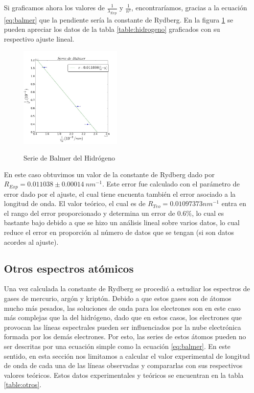 \documentclass[%
 reprint,
 amsmath,amssymb,
 aps,
]{revtex4-1}
\begin{document}
Si graficamos ahora los valores de $\frac{1}{\lambda_{Exp}}$ y $\frac{1}{n^2}$, encontraríamos, gracias a la ecuación \ref{eq:balmer} que la pendiente sería la constante de Rydberg. En la figura \ref{fig:balmer} se pueden apreciar los datos de la tabla \ref{table:hidrogeno} graficados con su respectivo ajuste lineal.\\

\begin{figure}[h]
\caption{Serie de Balmer del Hidrógeno}
\centering
\includegraphics[width=0.45\textwidth]{balmer}
\label{fig:balmer}
\end{figure}

En este caso obtuvimos un valor de la constante de Rydberg dado por $R_{Exp} = 0.011038 \pm 0.00014\ nm^{-1}$. Este error fue calculado con el parámetro de error dado por el ajuste, el cual tiene encuenta también el error asociado a la longitud de onda. El valor teórico, el cual es de $R_{Teo} = 0.01097373 nm^{-1}$ entra en el rango del error proporcionado y determina un error de $0.6\%$, lo cual es bastante bajo debido a que se hizo un análisis lineal sobre varios datos, lo cual reduce el error en proporción al número de datos que se tengan (si son datos acordes al ajuste).\\


\subsection{\label{sec:level2}Otros espectros atómicos}
Una vez calculada la constante de Rydberg se procedió a estudiar los espectros de gases de mercurio, argón y kriptón. Debido a que estos gases son de átomos mucho más pesados, las soluciones de onda para los electrones son en este caso más complejas que la del hidrógeno, dado que en estos casos, los electrones que provocan las líneas espectrales pueden ser influenciados por la nube electrónica formada por los demás electrones. Por esto, las series de estos átomos pueden no ser descritas por una ecuación simple como la ecuación \ref{eq:balmer}. En este sentido, en esta sección nos limitamos a calcular el valor experimental de longitud de onda de cada una de las líneas observadas y compararlas con sus respectivos valores teóricos. Estos datos experimentales y teóricos se encuentran en la tabla \ref{table:otros}.\\
\end{document}
